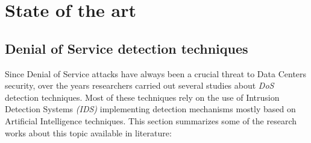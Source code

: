 
\chapter{State of the art}

\begin{citazione}
\end{citazione}
\newpage

\section{Denial of Service detection techniques}
Since Denial of Service attacks have always been a crucial threat to Data Centers security, over the years researchers carried out several studies about \emph{DoS} detection techniques. Most of these techniques rely on the use of Intrusion Detection Systems \emph{(IDS)} implementing detection mechanisms mostly based on Artificial Intelligence techniques. This section summarizes some of the research works about this topic available in literature:
